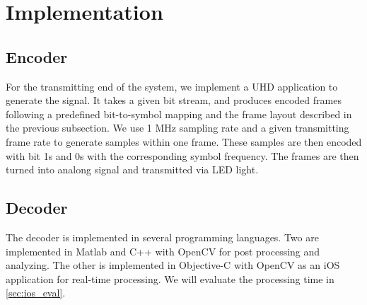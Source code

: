\section{Implementation}


\subsection{Encoder} 
For the transmitting end of the system, we implement a UHD application to generate the signal. It takes a given bit stream, and produces encoded frames following a predefined bit-to-symbol mapping and the frame layout described in the previous subsection. We use 1 MHz sampling rate and a given transmitting frame rate to generate samples within one frame. These samples are then encoded with bit 1s and 0s with the corresponding symbol frequency.
The frames are then turned into analong signal and transmitted via LED light.

\subsection{Decoder} 

The decoder is implemented in several programming languages. Two are implemented in Matlab and C++ with OpenCV for post processing and analyzing. 
The other is implemented in Objective-C with OpenCV as an iOS application for real-time processing. We will evaluate the processing time in \autoref{sec:ios_eval}.